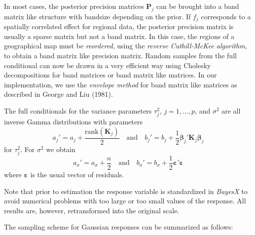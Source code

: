 \documentclass[11pt,a4paper,twoside]{bayesxarticle}
\def \Kvec {\vec{K}}
\def \Pvec {\vec{P}}
\def \betavec {\boldsymbol{\beta}}
\def \varepsilonvec {\boldsymbol{\varepsilon}}
\def \Kvec {\mathbf{K}}
\def \Pvec {\mathbf{P}}
\begin{document}
In most cases, the posterior precision matrices $\Pvec_j$ can be brought
into a band matrix like structure with bandsize depending on the
prior. If $f_j$ corresponds to a spatially correlated effect for
regional data, the posterior precision matrix is usually a sparse
matrix but not a band matrix. In this case, the regions of a
geographical map must be {\em reordered}, using the {\em reverse
Cuthill-McKee algorithm}, to obtain a band matrix like precision
matrix. Random samples from the full conditional can now be drawn in
a very efficient way using Cholesky decompositions for band matrices
or band matrix like matrices. In our implementation, we use the {\em
envelope method} for band matrix like matrices as described in
George and Liu (1981).

The full conditionals for the variance parameters $\tau^2_j$,
$j=1,\dots,p$, and $\sigma^2$ are all inverse Gamma distributions
with parameters
\begin{equation}
\label{hypab} a_j' = a_j + \frac{\mathrm{rank}(\Kvec_j)}{2} \quad
\mbox{and} \quad b_j' = b_j + \frac{1}{2} \betavec_j'\Kvec_j \betavec_j
\end{equation}
for $\tau^2_j$. For $\sigma^2$ we obtain
\begin{equation}
\label{hypabsigma} a_{\sigma}' = a_{\sigma}+\frac{n}{2} \quad
\mbox{and} \quad b_{\sigma}' = b_{\sigma} + \frac{1}{2}
\varepsilonvec'\varepsilonvec
\end{equation}
where $\varepsilonvec$ is the usual vector of residuals.

Note that prior to estimation the response variable is standardized
in {\em BayesX} to avoid numerical problems with too large or too
small values of the response. All results are, however,
retransformed into the original scale.

The sampling scheme for Gaussian responses can be summarized as
follows:
\end{document}
